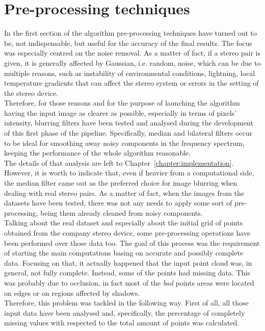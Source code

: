 \section{Pre-processing techniques}
\label{section:pre-process-tech}

In the first section of the algorithm pre-processing techniques have turned out to be, not indispensable, but useful for the accuracy of the final results.
The focus was especially centred on the noise removal. 
As a matter of fact, if a stereo pair is given, it is generally affected by Gaussian, i.e. random, noise, which can be due to multiple reasons, such as instability of environmental conditions, lightning, local temperature gradients that can affect the stereo system or errors in the setting of the stereo device. \\
Therefore, for those reasons and for the purpose of launching the algorithm having the input image as clearer as possible, especially in terms of pixels' intensity, blurring filters have been tested and analysed during the development of this first phase of the pipeline. 
Specifically, median and bilateral filters occur to be ideal for smoothing away noisy components in the frequency spectrum, keeping the performance of the whole algorithm reasonable. \\
The details of that analysis are left to Chapter~\ref{chapter:implementation}.
However, it is worth to indicate that, even if heavier from a computational side, the median filter came out as the preferred choice for image blurring when dealing with real stereo pairs.
As a matter of fact, when the images from the datasets have been tested, there was not any needs to apply some sort of pre-processing, being them already cleaned from noisy components. \\
Talking about the real dataset and especially about the initial grid of points obtained from the company stereo device, some pre-processing operations have been performed over those data too. 
The goal of this process was the requirement of starting the main computations basing on accurate and possibly complete data. 
Focusing on that, it actually happened that the input point cloud was, in general, not fully complete. 
Instead, some of the points had missing data.
This was probably due to occlusion, in fact most of the \textit{bad} points areas were located on edges or on regions affected by shadows. \\
Therefore, this problem was tackled in the following way.
First of all, all those input data have been analysed and, specifically, the percentage of completely missing values with respected to the total amount of points was calculated. 
